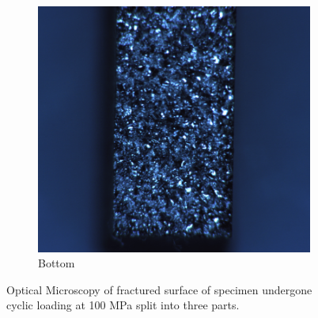 \documentclass[11pt,a4paper]{article}
\begin{document}
\begin{figure} [ht]
\begin{subfigure}{0.335\textwidth}
\includegraphics[scale=0.27]{2 kN Bottom.png}
\caption{Bottom}
\end{subfigure}
\caption{Optical Microscopy of fractured surface of specimen undergone cyclic loading at 100 MPa split into three parts.}
\label{optical_fractured}
\end{figure}
\end{document}

